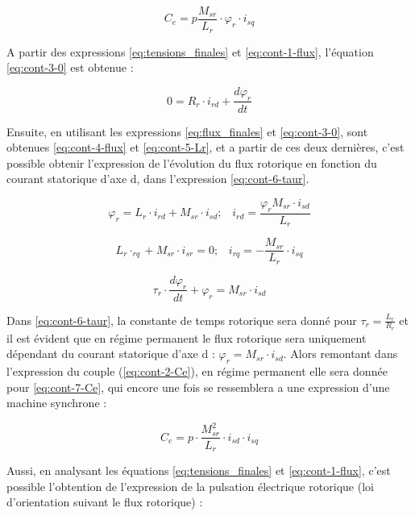 \begin{equation}
    C_e = p \frac{M_{sr}}{L_r} \cdot \varphi_r \cdot i_{sq}
    \label{eq:cont-2-Ce}
\end{equation}

A partir des expressions \ref{eq:tensions_finales} et \ref{eq:cont-1-flux}, l'équation \ref{eq:cont-3-0} est obtenue :

\begin{equation}
    0 = R_r \cdot i_{rd} + \frac{d \varphi_r}{dt}
    \label{eq:cont-3-0}
\end{equation}

Ensuite, en utilisant les expressions \ref{eq:flux_finales} et \ref{eq:cont-3-0}, sont obtenues \ref{eq:cont-4-flux} et \ref{eq:cont-5-Lr}, et a partir de ces deux dernières, c'est possible obtenir l'expression de l'évolution du flux rotorique en fonction du courant statorique d'axe d, dans l'expression \ref{eq:cont-6-taur}.

\begin{equation}
    \varphi_{r} = L_{r} \cdot i_{rd} + M_{sr} \cdot i_{sd}; \;\;\; i_{rd} = \frac{\varphi_r M_{sr} \cdot i_{sd}}{L_r}
    \label{eq:cont-4-flux}
\end{equation}

\begin{equation}
    L_r \cdot_{rq} + M_{sr} \cdot i_{sr} = 0; \;\;\; i_{rq} = -\frac{M_{sr}}{L_r}
    \label{eq:cont-5-Lr}
 \cdot i_{sq}\end{equation}


\begin{equation}
    \tau_r \cdot \frac{d \varphi_r}{dt} + \varphi_r = M_{sr} \cdot i_{sd}
    \label{eq:cont-6-taur}
\end{equation}

Dans \ref{eq:cont-6-taur}, la constante de temps rotorique sera donné pour $\tau_r = \frac{L_r}{R_r}$ et il est évident que en régime permanent le flux rotorique sera uniquement dépendant du courant statorique d'axe d : $\varphi_r = M_{sr} \cdot i_{sd}$. Alors remontant dans l'expression du couple (\ref{eq:cont-2-Ce}), en régime permanent elle sera donnée pour \ref{eq:cont-7-Ce}, qui encore une fois se ressemblera a une expression d'une machine synchrone :


\begin{equation}
    C_e = p \cdot \frac{M_{sr}^2}{L_r} \cdot i_{sd} \cdot i_{sq}
    \label{eq:cont-7-Ce}
\end{equation}

Aussi, en analysant les équations \ref{eq:tensions_finales} et \ref{eq:cont-1-flux}, c'est possible l'obtention de l'expression de la pulsation électrique rotorique (loi d'orientation suivant le flux rotorique) :

